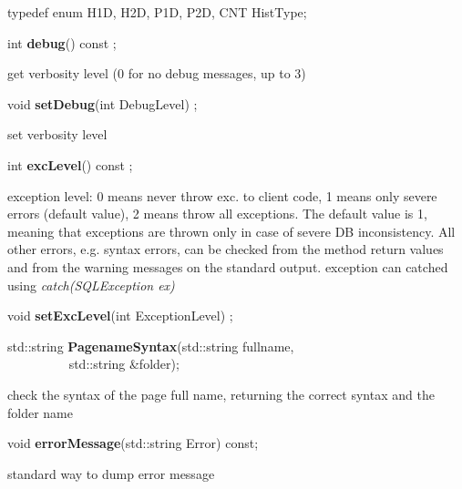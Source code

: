 \item   typedef enum { H1D, H2D, P1D, P2D, CNT} HistType;
\item    int {\bf debug}() const ;

 get verbosity level (0 for no debug messages, up to 3)


\item    void {\bf setDebug}(int DebugLevel) ;

 set verbosity level


\item    int {\bf excLevel}() const ;

 exception level: 0 means never throw exc. to client code, 1 means only
 severe errors (default value), 2 means throw all exceptions.
 The default value is 1, meaning that exceptions are thrown only in
 case of severe DB inconsistency. All other errors, e.g. syntax errors,
 can be checked from the method return values and from the warning
 messages on the standard output.
 exception can catched using {\it catch(SQLException ex)}


\item    void {\bf setExcLevel}(int ExceptionLevel) ;




\item    std::string {\bf PagenameSyntax}(std::string fullname,\\\mbox{}~~~~~~~~~ std::string \&folder);


 check the syntax of the page full name, returning the correct syntax and the folder name 


\item    void {\bf errorMessage}(std::string Error) const; 


 standard way to dump error message


